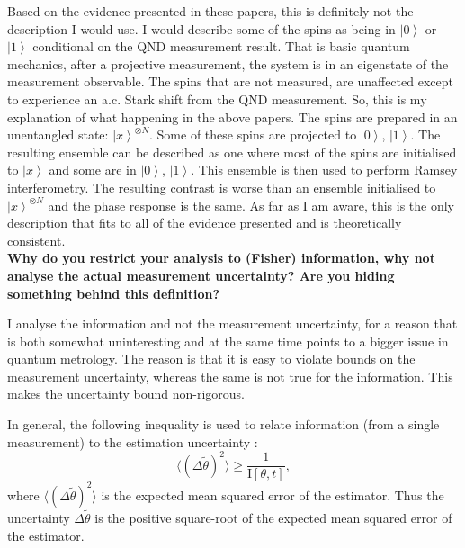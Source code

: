 \documentclass[reqno]{amsart}
\def\be{\begin{equation}}
\def\ee{\end{equation}}
\def\est#1{\tilde{#1}}
\newcommand{\ket}[1]{\left| #1 \right>}
\def\func#1#2{\mathrm{#1}\left[#2\right]}
\begin{document}
Based on the evidence presented in these papers, this is definitely not the description I would use. I would describe some of the spins as being in $\ket{0}$ or $\ket{1}$ conditional on the QND measurement result. That is basic quantum mechanics, after a projective measurement, the system is in an eigenstate of the measurement observable. The spins that are not measured, are unaffected except to experience an a.c. Stark shift from the QND measurement. So, this is my explanation of what happening in the above papers. The spins are prepared in an unentangled state: $\ket{x}^{\otimes N}$. Some of these spins are projected to $\ket{0}$, $\ket{1}$. The resulting ensemble can be described as one where most of the spins are initialised to $\ket{x}$ and some are in $\ket{0}$, $\ket{1}$. This ensemble is then used to perform Ramsey interferometry. The resulting contrast is worse than an ensemble initialised to $\ket{x}^{\otimes N}$ and the phase response is the same. As far as I am aware, this is the only description that fits to all of the evidence presented and is theoretically consistent.\\

\textbf{Why do you restrict your analysis to (Fisher) information, why not analyse the actual measurement uncertainty? Are you hiding something behind this definition?}

I analyse the information and not the measurement uncertainty, for a reason that is both somewhat uninteresting and at the same time points to a bigger issue in quantum metrology. The reason is that it is easy to violate bounds on the measurement uncertainty, whereas the same is not true for the information. This makes the uncertainty bound non-rigorous.

In general, the following inequality is used to relate information (from a single measurement) to the estimation uncertainty \cite{Braunstein1996, Giovannetti2004, Giovannetti2006, DemkowiczDobrzanski2012, Pang2014, Yuan2015, Pang2017}:
\be
\langle (\Delta \est{\theta})^2\rangle \ge \frac{1}{\func{I}{\theta,t}},
\label{eq:info}
\ee
where $\langle (\Delta \est{\theta})^2\rangle$ is the expected mean squared error of the estimator. Thus the uncertainty $\Delta \est{\theta}$ is the positive square-root of the expected mean squared error of the estimator.
\end{document}
